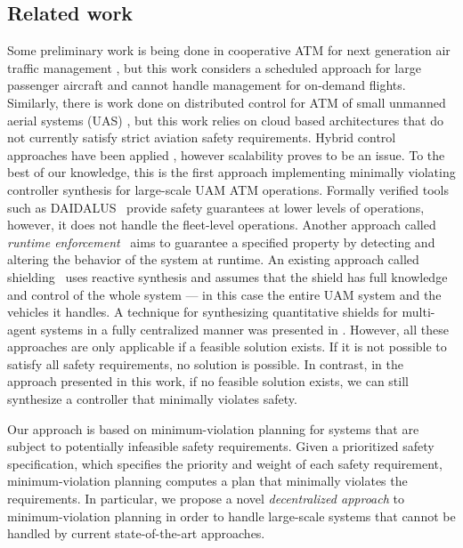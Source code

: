 \subsection{Related work}
Some preliminary work is being done in cooperative ATM for next generation air traffic management \cite{prevot2005co}, but this work considers a scheduled approach for large passenger aircraft and cannot handle management for on-demand flights. Similarly, there is work done on distributed control for ATM of small unmanned aerial systems (UAS) \cite{FSLLK2015}, but this work relies on cloud based architectures that do not currently satisfy strict aviation safety requirements.  Hybrid control approaches have been applied \cite{tomlin1996hybrid}, however scalability proves to be an issue.
To the best of our knowledge, this is the first approach implementing minimally violating
controller synthesis for large-scale UAM ATM operations. Formally verified tools such as DAIDALUS~\cite{Daidalus} provide safety guarantees at lower levels of operations, however, it does not handle the fleet-level operations. Another approach called \emph{runtime enforcement}~\cite{Falcone10,Schneider00} aims to guarantee a specified property by detecting and altering the behavior of the system at runtime. An existing approach called shielding~\cite{BloemKKW15,KonighoferABHKT17} uses reactive synthesis and assumes that the shield has full knowledge and control of the whole system --- in this case the entire UAM system and the vehicles it handles. A technique for synthesizing quantitative shields for multi-agent systems in a fully centralized manner was presented in \cite{multiagentshield}. However, all these approaches are only applicable if a feasible solution exists. If it is not possible to satisfy all safety requirements, no solution is possible. In contrast, in the approach presented in this work, if no feasible solution exists, we can still synthesize a controller that minimally violates safety. 

Our approach is based on minimum-violation planning for systems that are subject to potentially infeasible safety requirements. Given a prioritized safety specification, which specifies the priority and weight of each safety requirement, minimum-violation planning computes a plan that minimally violates the requirements. In particular, we propose a novel \emph{decentralized approach} to minimum-violation planning in order to handle large-scale systems that cannot be handled by current state-of-the-art approaches. 
